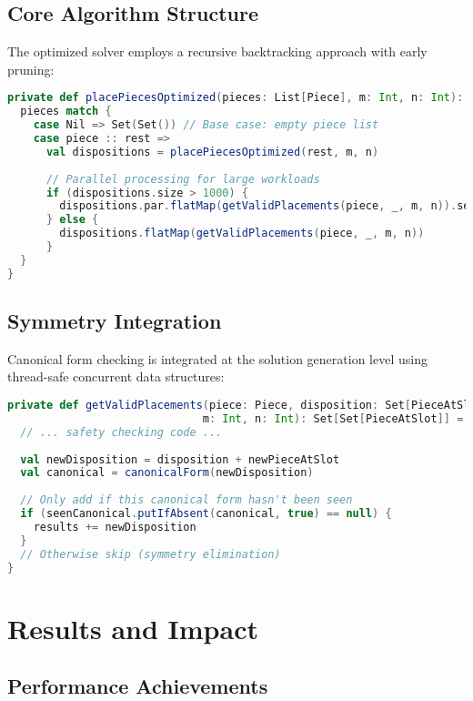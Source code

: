 \documentclass[12pt,a4paper]{article}
\theoremstyle{definition}
\begin{document}
\subsection{Core Algorithm Structure}

The optimized solver employs a recursive backtracking approach with early pruning:

\begin{lstlisting}[language=Scala, caption=Core Solver Logic]
private def placePiecesOptimized(pieces: List[Piece], m: Int, n: Int): Solutions = {
  pieces match {
    case Nil => Set(Set()) // Base case: empty piece list
    case piece :: rest =>
      val dispositions = placePiecesOptimized(rest, m, n)
      
      // Parallel processing for large workloads
      if (dispositions.size > 1000) {
        dispositions.par.flatMap(getValidPlacements(piece, _, m, n)).seq.toSet
      } else {
        dispositions.flatMap(getValidPlacements(piece, _, m, n))
      }
  }
}
\end{lstlisting}

\subsection{Symmetry Integration}

Canonical form checking is integrated at the solution generation level using thread-safe concurrent data structures:

\begin{lstlisting}[language=Scala, caption=Symmetry-Aware Placement]
private def getValidPlacements(piece: Piece, disposition: Set[PieceAtSlot], 
                              m: Int, n: Int): Set[Set[PieceAtSlot]] = {
  // ... safety checking code ...
  
  val newDisposition = disposition + newPieceAtSlot
  val canonical = canonicalForm(newDisposition)
  
  // Only add if this canonical form hasn't been seen
  if (seenCanonical.putIfAbsent(canonical, true) == null) {
    results += newDisposition
  }
  // Otherwise skip (symmetry elimination)
}
\end{lstlisting}

\section{Results and Impact}

\subsection{Performance Achievements}
\end{document}
